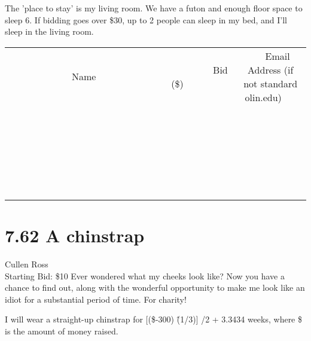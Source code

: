 \documentclass[11pt]{article}
\begin{document}
The 'place to stay' is my living room. We have a futon and enough floor space to sleep 6. If bidding goes over \$30, up to 2 people can sleep in my bed, and I'll sleep in the living room.
\\[6ex]
\begin{tabular}{c c c}
~~~~~~~~~~~~~Name~~~~~~~~~~~~~ & ~~~~~~~~~Bid (\$)~~~~~~~~~  & ~~~Email Address (if not standard olin.edu)~~~\\
 & & \\
\hline
 & & \\
\hline
 & & \\
\hline
 & & \\
\hline
 & & \\
\hline
 & & \\
\hline
 & & \\
\hline
 & & \\
\hline
 & & \\
\hline
 & & \\
\hline
 & & \\
\hline
 & & \\
\hline
 & & \\
\hline
 & & \\
\hline
 & & \\
\hline
 & & \\
\hline
 & & \\
\hline
 & & \\
\hline
 & & \\
\hline
 & & \\
\hline
 & & \\
\hline
 & & \\
\hline
 & & \\
\hline
 & & \\
\hline
 & & \\
\hline
 & & \\
\hline
\end{tabular}
\newpage
\section*{7.62 A chinstrap}
Cullen Ross
\\
Starting Bid: \$10
\newline
Ever wondered what my cheeks look like? Now you have a chance to find out, along with the wonderful opportunity to make me look like an idiot for a substantial period of time. For charity!

I will wear a straight-up chinstrap for [(\$-300) \^ (1/3)] /2 + 3.3434 weeks, where \$ is the amount of money raised.
\end{document}
